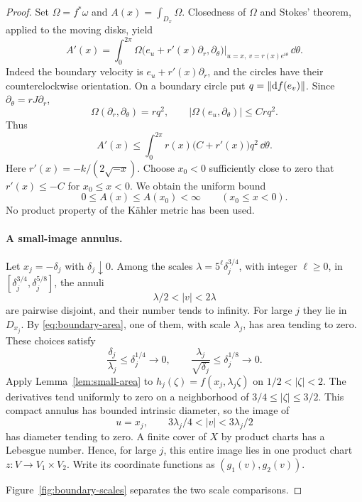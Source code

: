 \begin{proof}
Set $\Omega=f^*\omega$ and $A(x)=\int_{D_x}\Omega$.  Closedness of
$\Omega$ and Stokes' theorem, applied to the moving disks, yield
\[
 A'(x)=\int_0^{2\pi}
   \Omega\bigl(e_u+r'(x)\partial_r,\partial_\theta\bigr)
       \big|_{u=x,\ v=r(x)e^{i\theta}}\,\dd\theta.
\]
Indeed the boundary velocity is $e_u+r'(x)\partial_r$, and the circles
have their counterclockwise orientation.  On a boundary circle put
$q=\left\lVert\mathrm d f(e_v)\right\rVert$.  Since $\partial_\theta=rJ\partial_r$,
\[
  \Omega(\partial_r,\partial_\theta)=rq^2,
  \qquad
  |\Omega(e_u,\partial_\theta)|\le Crq^2.
\]
Thus
\[
  A'(x)\le\int_0^{2\pi}r(x)\bigl(C+r'(x)\bigr)q^2\,\dd\theta.
\]
Here $r'(x)=-k/(2\sqrt{-x})$.  Choose $x_0<0$ sufficiently close to
zero that $r'(x)\le-C$ for $x_0\le x<0$.  We obtain the uniform bound
\begin{equation}\label{eq:boundary-area}
  0\le A(x)\le A(x_0)<\infty\qquad(x_0\le x<0).
\end{equation}
No product property of the K\"ahler metric has been used.

\paragraph{A small-image annulus.}
Let $x_j=-\delta_j$ with $\delta_j\downarrow0$.  Among the scales
$\lambda=5^\ell\delta_j^{3/4}$, with integer $\ell\ge0$, in
$[\delta_j^{3/4},\delta_j^{5/8}]$, the annuli
\[
  \lambda/2<|v|<2\lambda
\]
are pairwise disjoint, and their number tends to infinity.  For large
$j$ they lie in $D_{x_j}$.  By \eqref{eq:boundary-area}, one of them,
with scale $\lambda_j$, has area tending to zero.  These choices satisfy
\begin{equation}\label{eq:boundary-scales}
  \frac{\delta_j}{\lambda_j}\le\delta_j^{1/4}\longrightarrow0,
  \qquad
  \frac{\lambda_j}{\sqrt{\delta_j}}
       \le\delta_j^{1/8}\longrightarrow0.
\end{equation}
Apply Lemma~\ref{lem:small-area} to
$h_j(\zeta)=f(x_j,\lambda_j\zeta)$ on $1/2<|\zeta|<2$.
The derivatives tend uniformly to zero on a neighborhood of
$3/4\le|\zeta|\le3/2$.  This compact annulus has bounded intrinsic
diameter, so the image of
\[
  u=x_j,\qquad 3\lambda_j/4<|v|<3\lambda_j/2
\]
has diameter tending to zero.  A finite cover of $X$ by product charts
has a Lebesgue number.  Hence, for large $j$, this entire image lies in
one product chart $z:V\to V_1\times V_2$.  Write its coordinate functions
as $(g_1(v),g_2(v))$.

Figure~\ref{fig:boundary-scales} separates the two scale comparisons.



\end{proof}
